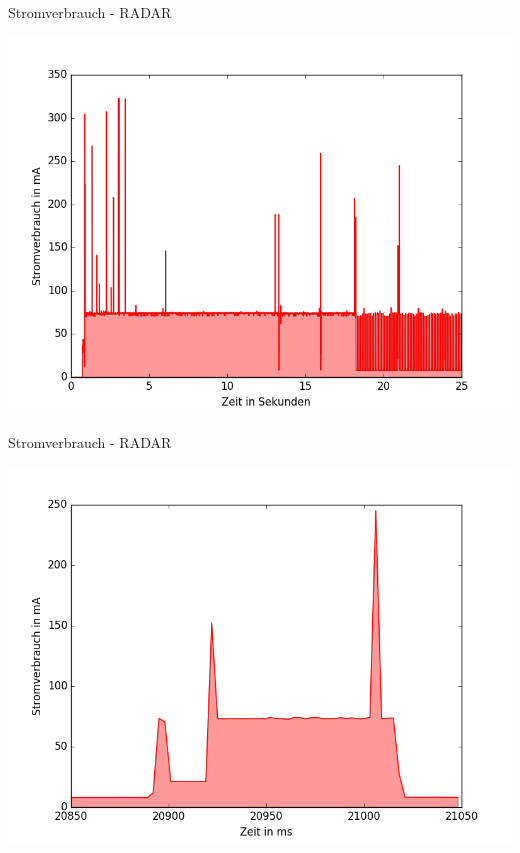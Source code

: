 \documentclass[18pt]{beamer}
\begin{document}
\begin{frame}{Stromverbrauch - RADAR}
	\begin{minipage}[c][\textheight][t]{\textwidth}
		\centering
		\includegraphics[height=0.85\textheight]{plots/radar5s.png}
	\end{minipage}
\end{frame}

\begin{frame}{Stromverbrauch - RADAR}
	\begin{minipage}[c][\textheight][t]{\textwidth}
		\centering
		\includegraphics[height=0.85\textheight]{plots/radar5ssend.png}
	\end{minipage}
\end{frame}
\end{document}
